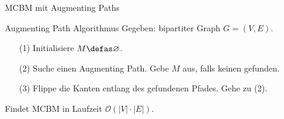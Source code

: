 \begin{frame}{MCBM mit Augmenting Paths}
\begin{block}{Augmenting Path Algorithmus}
Gegeben: bipartiter Graph \(G = (V, E)\).
\begin{itemize}
\pause\item[(1)] Initialisiere \(M \defas \varnothing\).
\pause\item[(2)] Suche einen Augmenting Path. Gebe \(M\) aus, falls keinen gefunden.
\pause\item[(3)] Flippe die Kanten entlang des gefundenen Pfades. Gehe zu (2).
\end{itemize}\pause
Findet MCBM in Laufzeit \(\mathcal{O}(|V|\cdot |E|)\).
\end{block}
\end{frame}
